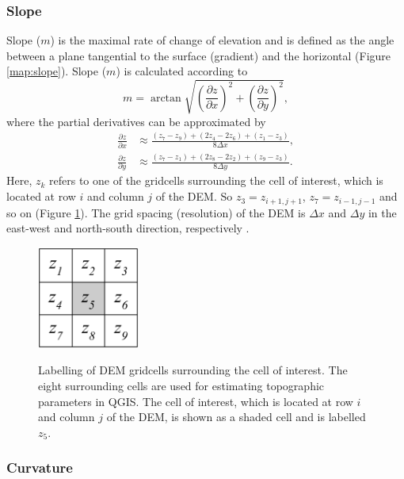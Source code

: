\documentclass{sfuthesis}
\begin{document}
\subsubsection*{Slope} 

Slope ($m$) is the maximal rate of change of elevation and is defined as the angle between a plane tangential to the surface (gradient) and the horizontal \citep{Olaya2009} (Figure \ref{map:slope}). Slope ($m$) is calculated according to 
\begin{equation}
m = \arctan \sqrt{\left( \frac{\partial z}{\partial x} \right) ^2 + \left( \frac{\partial z}{\partial y} \right) ^2},
\end{equation}
where the partial derivatives can be approximated by \citep{Mitavsova1993, Neteler2008, Hofierka2009}
\begin{align} \label{eq:firstpartial}
\frac{\partial z}{\partial x} &\approx \frac{(z_7-z_9)+(2z_4-2z_6)+(z_1-z_3)}{8  \Delta x},\nonumber \\
\frac{\partial z}{\partial y} &\approx \frac{(z_7-z_1)+(2z_8-2z_2)+(z_9-z_3)}{8  \Delta y}.
\end{align}
Here, $z_k$ refers to one of the gridcells surrounding the cell of interest, which is located at row $i$ and column $j$ of the DEM. So $z_3 = z_{i+1,j+1}$, $z_7 = z_{i-1,j-1}$ and so on (Figure \ref{fig:DEMgrid}). The grid spacing (resolution) of the DEM is $\Delta x$ and $\Delta y$ in the east-west and north-south direction, respectively \citep{Neteler2008}. 

\begin{figure}
	\centering
	\includegraphics[width = 0.3\textwidth]{DEMGrid.png}\\
	\caption{Labelling of DEM gridcells surrounding the cell of interest. The eight surrounding cells are used for estimating topographic parameters in QGIS. The cell of interest, which is located at row $i$ and column $j$ of the DEM, is shown as a shaded cell and is labelled $z_5$.}
	\label{fig:DEMgrid}
\end{figure}

\subsubsection*{Curvature} 
\end{document}
